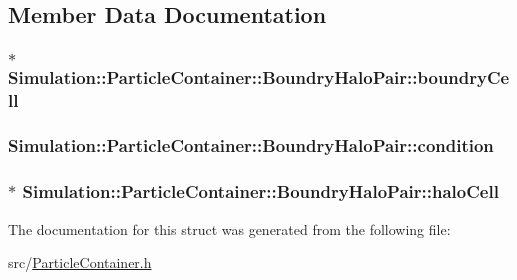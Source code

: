 \subsection{Member Data Documentation}
\hypertarget{structSimulation_1_1ParticleContainer_1_1BoundryHaloPair_a94d8d53d4c93c7ce4a4ee86f71da886a}{
\subsubsection[{boundry\-Cell}]{$\ast$ Simulation\-::\-Particle\-Container\-::\-Boundry\-Halo\-Pair\-::boundry\-Cell}}\label{structSimulation_1_1ParticleContainer_1_1BoundryHaloPair_a94d8d53d4c93c7ce4a4ee86f71da886a}
\hypertarget{structSimulation_1_1ParticleContainer_1_1BoundryHaloPair_a0b50969393c4c4aec8f74a3f7db2ec44}{
\subsubsection[{condition}]{ Simulation\-::\-Particle\-Container\-::\-Boundry\-Halo\-Pair\-::condition}}\label{structSimulation_1_1ParticleContainer_1_1BoundryHaloPair_a0b50969393c4c4aec8f74a3f7db2ec44}
\hypertarget{structSimulation_1_1ParticleContainer_1_1BoundryHaloPair_aabcdae0bd0b5d88841a0a589f18403c8}{
\subsubsection[{halo\-Cell}]{$\ast$ Simulation\-::\-Particle\-Container\-::\-Boundry\-Halo\-Pair\-::halo\-Cell}}\label{structSimulation_1_1ParticleContainer_1_1BoundryHaloPair_aabcdae0bd0b5d88841a0a589f18403c8}


The documentation for this struct was generated from the following file\-:\begin{DoxyCompactItemize}
\item 
src/\hyperlink{ParticleContainer_8h}{Particle\-Container.\-h}\end{DoxyCompactItemize}
